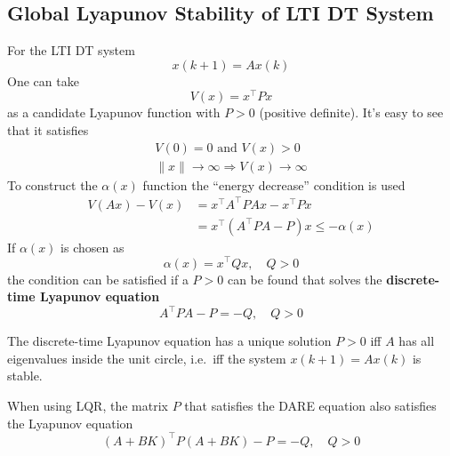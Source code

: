 \subsection{Global Lyapunov Stability of LTI DT System}

For the LTI DT system
\begin{equation*}
    x(k+1)=Ax(k)
\end{equation*}
One can take
\begin{equation*}
    V(x) = x^\top Px
\end{equation*}
as a candidate Lyapunov function with $P>0$ (positive definite). It's easy to see that it satisfies
\begin{gather*}
    V(0) = 0 \text{ and } V(x) > 0 \\
    \lVert x \rVert \to \infty \Rightarrow V(x) \to \infty
\end{gather*}
To construct the $\alpha(x)$ function the ``energy decrease'' condition is used
\begin{align*}
    V(Ax) - V(x) & = x^\top A^\top PAx - x^\top Px                      \\
                 & = x^\top \left(A^\top PA - P\right)x \leq -\alpha(x)
\end{align*}
If $\alpha(x)$ is chosen as
\begin{equation*}
    \alpha(x) = x^\top Qx, \quad Q > 0
\end{equation*}
the condition can be satisfied if a $P>0$ can be found that solves the \textbf{discrete-time Lyapunov equation}
\begin{equation*}
    A^\top PA -P = -Q, \quad Q > 0
\end{equation*}

The discrete-time Lyapunov equation has a unique solution $P > 0$ iff $A$ has all eigenvalues inside the unit circle, i.e.\ iff the system $x(k + 1) = Ax(k)$ is stable.

\newpar{}

When using LQR, the matrix $P$ that satisfies the DARE equation also satisfies the Lyapunov equation
\begin{equation*}
    {(A+BK)}^\top P{(A+BK)} -P = -Q, \quad Q>0
\end{equation*}

